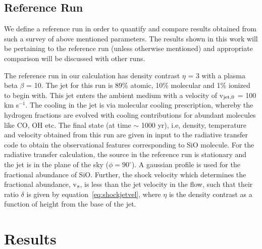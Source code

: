 \documentclass[useAMS,usenatbib]{mn2e}
\begin{document}
\subsection{Reference Run}
\label{ssec:refrun}
We define a reference run in order to quantify and compare results obtained from such a
survey of above mentioned parameters. The results shown in this work will be
pertaining to the reference run (unless otherwise mentioned) and appropriate comparison will be
discussed with other runs.
%

The reference run in our calculation has density contrast $\eta$ = 3
with a plasma beta $\beta$ = 10. The jet for this run is 89\% atomic,
10\% molecular and 1\% ionized to begin with. This jet enters the
ambient medium with a velocity of v$_{\rm jet,0}$ = 100 km
s$^{-1}$. The cooling in the jet is
via molecular cooling prescription, whereby the hydrogen fractions are
evolved with cooling contributions for abundant molecules like CO, OH
etc. The final state (at time $\sim$ 1000 yr), i.e, density, temperature and velocity obtained from this 
run are given in input to the radiative transfer code to obtain the observational features
corresponding to SiO molecule. 
For the radiative transfer calculation, the source in the reference
run is stationary and the jet is in the plane of the sky ($\phi =
90^{\circ}$). A gaussian profile is used for the fractional abundance
of SiO.
Further, the shock velocity which determines
the fractional abundance, v$_{\rm s}$, is less than the jet velocity in the
flow, such that their ratio $\delta$ is given by
equation~\ref{eq:shockjetvel}, where $\eta$ is the density contrast as a
function of height from the base of the jet.

\section{Results}
\label{sec:results}
\end{document}
